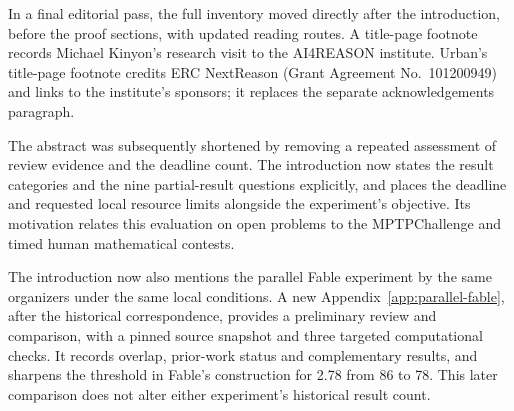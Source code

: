 In a final editorial pass, the full inventory moved directly after the
introduction, before the proof sections, with updated reading routes.
A title-page footnote records Michael Kinyon's research visit to the
AI4REASON institute. Urban's title-page footnote credits ERC NextReason
(Grant Agreement No.\ 101200949) and links to the institute's sponsors;
it replaces the separate acknowledgements paragraph.

The abstract was subsequently shortened by removing a repeated assessment
of review evidence and the deadline count. The introduction now states
the result categories and the nine partial-result questions explicitly,
and places the deadline and requested local resource limits alongside
the experiment's objective. Its motivation relates this evaluation on
open problems to the MPTPChallenge and timed human mathematical contests.

The introduction now also mentions the parallel Fable experiment by the
same organizers under the same local conditions. A new
Appendix~\ref{app:parallel-fable}, after the historical correspondence,
provides a preliminary review and comparison, with a pinned source
snapshot and three targeted computational checks. It records overlap,
prior-work status and complementary results, and sharpens the threshold
in Fable's construction for 2.78 from 86 to 78. This later comparison
does not alter either experiment's historical result count.






